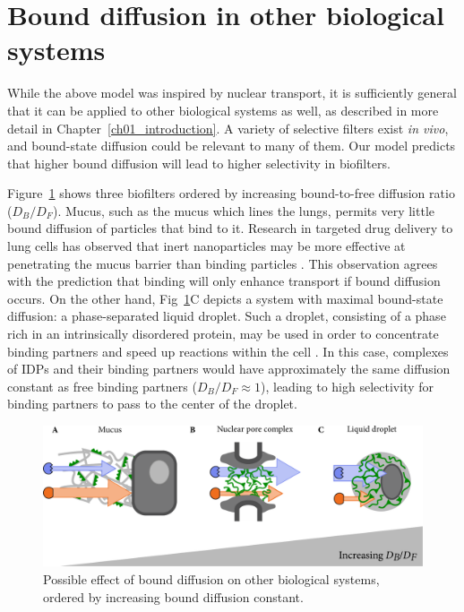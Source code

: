 \section{Bound diffusion in other biological systems}
\label{sec:other-filters}

While the above model was inspired by nuclear transport, it is sufficiently general that it can be applied to other biological systems as well, as described in more detail in Chapter~\ref{ch01_introduction}.  A variety of selective filters exist \textit{in vivo}, and bound-state diffusion could be relevant to many of them.  Our model predicts that higher bound diffusion will lead to higher selectivity in biofilters.  

Figure~\ref{fig:other-filters} shows three biofilters ordered by increasing bound-to-free diffusion ratio ($D_B/D_F$).  Mucus, such as the mucus which lines the lungs, permits very little bound diffusion of particles that bind to it.  Research in targeted drug delivery to lung cells has observed that inert nanoparticles may be more effective at penetrating the mucus barrier than binding particles \cite{witten17}.  This observation agrees with the prediction that binding will only enhance transport if bound diffusion occurs.   On the other hand, Fig~\ref{fig:other-filters}C depicts a system with maximal bound-state diffusion: a phase-separated liquid droplet.  Such a droplet, consisting of a phase rich in an intrinsically disordered protein, may be used in order to concentrate binding partners and speed up reactions within the cell \cite{brangwynne15, feric16}.  In this case, complexes of IDPs and their binding partners would have approximately the same diffusion constant as free binding partners ($D_B/D_F \approx 1$), leading to high selectivity for binding partners to pass to the center of the droplet.

\begin{figure}
\centering
\includegraphics[width=0.8\linewidth]{figs/ch02/concluding-cartoon-large.pdf}
\caption[Bound diffusion in other systems.]{Possible effect of bound diffusion on other biological systems, ordered by increasing bound diffusion constant.}
\label{fig:other-filters}
\end{figure}


